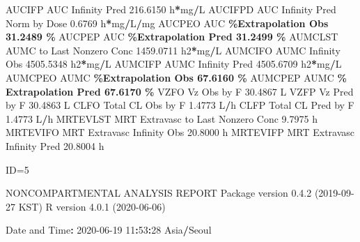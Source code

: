\documentclass[
  10pt,
]{krantz}
\makeatletter
\newenvironment{Shaded}{\begin{snugshade}}{\end{snugshade}}
\newcommand{\DecValTok}[1]{\textcolor[rgb]{0.00,0.00,0.81}{#1}}
\newcommand{\FloatTok}[1]{\textcolor[rgb]{0.00,0.00,0.81}{#1}}
\newcommand{\NormalTok}[1]{#1}
\newcommand{\OperatorTok}[1]{\textcolor[rgb]{0.81,0.36,0.00}{\textbf{#1}}}
\newcommand{\StringTok}[1]{\textcolor[rgb]{0.31,0.60,0.02}{#1}}
\newenvironment{kframe}{%
\medskip{}
\setlength{\fboxsep}{.8em}
 \def\at@end@of@kframe{}%
 \ifinner\ifhmode%
  \def\at@end@of@kframe{\end{minipage}}%
  \begin{minipage}{\columnwidth}%
 \fi\fi%
 \def\FrameCommand##1{\hskip\@totalleftmargin \hskip-\fboxsep
 \colorbox{shadecolor}{##1}\hskip-\fboxsep
     \hskip-\linewidth \hskip-\@totalleftmargin \hskip\columnwidth}%
 \MakeFramed {\advance\hsize-\width
   \@totalleftmargin\z@ \linewidth\hsize
   \@setminipage}}%
 {\par\unskip\endMakeFramed%
 \at@end@of@kframe}
\renewenvironment{Shaded}{\begin{kframe}}{\end{kframe}}
\makeatother
\begin{document}
\begin{Shaded}
\begin{Highlighting}[]
\NormalTok{AUCIFP     AUC Infinity Pred                             }\FloatTok{216.6150}\NormalTok{ h}\OperatorTok{*}\NormalTok{mg}\OperatorTok{/}\NormalTok{L}
\NormalTok{AUCIFPD    AUC Infinity Pred Norm by Dose                  }\FloatTok{0.6769}\NormalTok{ h}\OperatorTok{*}\NormalTok{mg}\OperatorTok{/}\NormalTok{L}\OperatorTok{/}\NormalTok{mg}
\NormalTok{AUCPEO     AUC }\OperatorTok{\%Extrapolation Obs                         31.2489 \%}
\NormalTok{AUCPEP     AUC }\OperatorTok{\%Extrapolation Pred                        31.2499 \%}
\NormalTok{AUMCLST    AUMC to Last Nonzero Conc                    }\FloatTok{1459.0711}\NormalTok{ h2}\OperatorTok{*}\NormalTok{mg}\OperatorTok{/}\NormalTok{L}
\NormalTok{AUMCIFO    AUMC Infinity Obs                            }\FloatTok{4505.5348}\NormalTok{ h2}\OperatorTok{*}\NormalTok{mg}\OperatorTok{/}\NormalTok{L}
\NormalTok{AUMCIFP    AUMC Infinity Pred                           }\FloatTok{4505.6709}\NormalTok{ h2}\OperatorTok{*}\NormalTok{mg}\OperatorTok{/}\NormalTok{L}
\NormalTok{AUMCPEO    AUMC }\OperatorTok{\%Extrapolation Obs                        67.6160 \%}
\NormalTok{AUMCPEP    AUMC }\OperatorTok{\% Extrapolation Pred                      67.6170 \%}
\NormalTok{VZFO       Vz Obs by F                                    }\FloatTok{30.4867}\NormalTok{ L}
\NormalTok{VZFP       Vz Pred by F                                   }\FloatTok{30.4863}\NormalTok{ L}
\NormalTok{CLFO       Total CL Obs by F                               }\FloatTok{1.4773}\NormalTok{ L}\OperatorTok{/}\NormalTok{h}
\NormalTok{CLFP       Total CL Pred by F                              }\FloatTok{1.4773}\NormalTok{ L}\OperatorTok{/}\NormalTok{h}
\NormalTok{MRTEVLST   MRT Extravasc to Last Nonzero Conc              }\FloatTok{9.7975}\NormalTok{ h}
\NormalTok{MRTEVIFO   MRT Extravasc Infinity Obs                     }\FloatTok{20.8000}\NormalTok{ h}
\NormalTok{MRTEVIFP   MRT Extravasc Infinity Pred                    }\FloatTok{20.8004}\NormalTok{ h}





\NormalTok{ID=}\DecValTok{5}

\NormalTok{                        NONCOMPARTMENTAL ANALYSIS REPORT}
\NormalTok{                       Package version }\DecValTok{0}\NormalTok{.}\FloatTok{4.2}\NormalTok{ (}\DecValTok{2019{-}09{-}27}\NormalTok{ KST)}
\NormalTok{                          R version }\DecValTok{4}\NormalTok{.}\FloatTok{0.1}\NormalTok{ (}\DecValTok{2020{-}06{-}06}\NormalTok{)}

\NormalTok{Date and Time}\OperatorTok{:}\StringTok{ }\DecValTok{2020{-}06{-}19} \DecValTok{11}\OperatorTok{:}\DecValTok{53}\OperatorTok{:}\DecValTok{28}\NormalTok{ Asia}\OperatorTok{/}\NormalTok{Seoul}


\end{Highlighting}
\end{Shaded}
\end{document}
